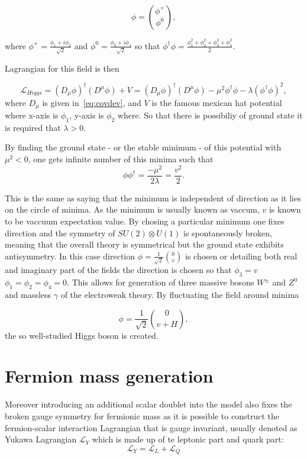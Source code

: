 \begin{equation}
\phi = \binom{\phi^{+}}{\phi^{0}},
\end{equation}

where $\phi^{+} = \frac{\phi_{1} + i{\phi_{2}}}{\sqrt{2}}$ and $\phi^{0} = \frac{\phi_{3} + i{\phi_{4}}}{\sqrt{2}}$ so that $\phi^{\dagger}\phi = \frac{\phi_{1}^{2} + \phi_{2}^{2} + \phi_{3}^{2} + \phi_{4}^{2}}{2}$.

Lagrangian for this field is then



\begin{equation}
	\mathcal{L}_{Higgs} = (D_{\mu}\phi)^{\dagger}(D^{\mu}\phi) + V = (D_{\mu}\phi)^{\dagger}(D^{\mu}\phi) - \mu^{2}\phi^{\dagger}\phi - \lambda (\phi^{\dagger}\phi)^{2},
\end{equation}
where $D_{\mu}$ is given in~\autoref{eq:covdev}, and $V$ is the famous mexican hat potential where x-axis is $\phi_{1}$, y-axis is $\phi_{2}$ where. So that there is possibiliy of ground state it is required that $\lambda>0$.

By finding the ground state - or the stable minimum - of this potential with $\mu^{2}<0$, one gets infinite number of this minima such that
\begin{equation}
	\phi\phi^{\dagger}=\frac{-\mu^{2}}{2\lambda}=\frac{v^{2}}{2}.
\end{equation}

This is the same as saying that the minimum is independent of direction as it lies on the circle of minima. As the minimum is usually known as vaccum, $v$ is known to be vaccuum expectation value. By chosing a particular minimum one fixes direction and the symmetry of $SU(2)\otimes U(1)$ is spontaneously broken, meaning that the overall theory is symmetrical but the ground state exhibits antisymmetry. In this case direction $\phi=\frac{1}{\sqrt{2}}\binom{0}{v}$ is chosen or detailing both real and imaginary part of the fields the direction is chosen so that $\phi_{3}=v$ $\phi_{1}=\phi_{2}=\phi_{4}=0$. This allows for generation of three massive bosons $W^{\pm}$ and $Z^{0}$ and massless $\gamma$ of the electroweak theory. By fluctuating the field around minima 

\begin{equation}
\phi=\frac{1}{\sqrt{2}}\binom{0}{v+H},
\label{eq:ref}
\end{equation}
the so well-studied Higgs boson is created.


\section{Fermion mass generation}
Moreover introducing an additional scalar doublet into the model also fixes the broken gauge symmetry for fermionic mass as it is possible to construct the fermion-scalar interaction Lagrangian that is gauge invariant, usually denoted as Yukawa Lagrangian $\mathcal{L}_{Y}$ which is made up of te leptonic part and quark part:
\begin{equation}
	\mathcal{L}_{Y}= \mathcal{L}_{L} + \mathcal{L}_{Q}
\end{equation}

